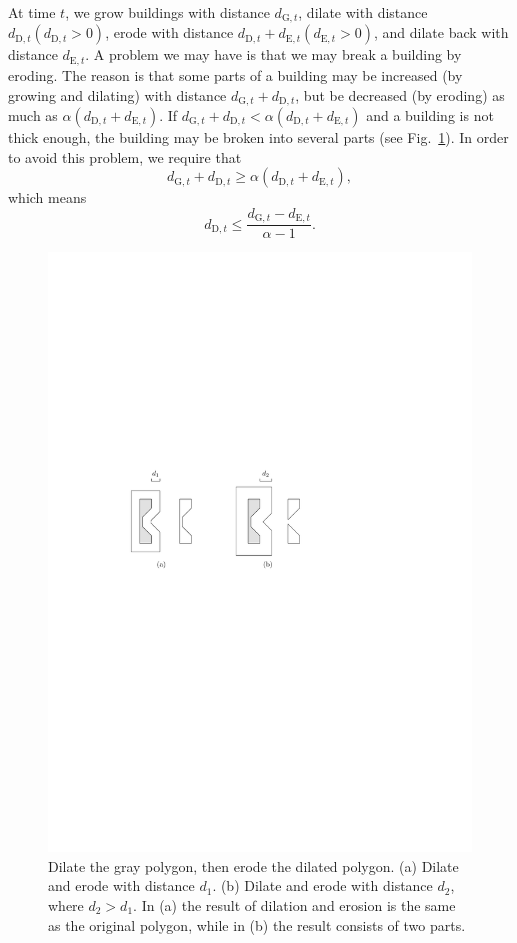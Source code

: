 \documentclass[graybox]{svmult}
\newcommand{\fig}{Fig.~}
\newcommand{\dtrm}[1]{d_{\mathrm{#1},t}}
\begin{document}
At time $t$, we grow buildings with distance $\dtrm{G}$,
dilate with distance $\dtrm{D} (\dtrm{D}>0)$,
erode with distance $\dtrm{D}+\dtrm{E} (\dtrm{E}>0)$,
and dilate back with distance $\dtrm{E}$.
A problem we may have is that we may break a building by eroding.
The reason is that 
some parts of a building may be increased (by growing and dilating) 
with distance $\dtrm{G}+\dtrm{D}$, 
but be decreased (by eroding) as much as $\alpha (\dtrm{D}+\dtrm{E})$.
If  $\dtrm{G}+\dtrm{D} < \alpha (\dtrm{D}+\dtrm{E})$ 
and a building is not thick enough, 
the building may be broken into several parts
(see \fig\ref{fig:ErosionBreak}).
In order to avoid this problem, we require that
\[
\dtrm{G} + \dtrm{D} \ge \alpha (\dtrm{D}+\dtrm{E}),
\]
which means
\begin{equation}
\label{eq:d_Dt}
\dtrm{D} \le \frac{\dtrm{G}-\dtrm{E}}{\alpha - 1}.
\end{equation}

\begin{figure}[tb]
	\centering
	\includegraphics[draft=false]{ErosionBreak}
	\caption{Dilate the gray polygon, then erode the dilated polygon.
		(a) Dilate and erode with distance $d_1$.
		(b) Dilate and erode with distance $d_2$, where $d_2>d_1$.
		In (a) the result of dilation and erosion is the same as the original 
		polygon, while in (b) the result consists of two parts.
	}
	\label{fig:ErosionBreak}
\end{figure}
\end{document}
